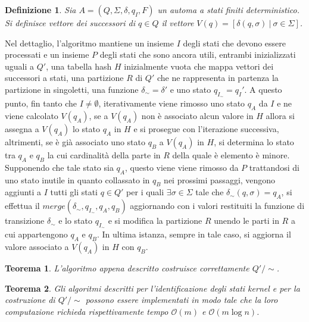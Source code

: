 \documentclass[a4paper,12pt,twoside,openright]{report}
\newcommand{\partitioned}[2]{#1\slash\!\!#2}  %
\newcommand{\bigo}[0]{\mathcal{O}}            %
\newtheorem{theorem}{Teorema}[chapter]        %
\newtheorem{definition}{Definizione}[chapter] %
\begin{document}
\begin{definition}
  Sia $A = (Q, \Sigma, \delta, q_I, F)$ un automa a stati finiti deterministico. Si definisce
  \emph{vettore dei successori} di $q \in Q$ il vettore $V(q) = [\delta(q, \sigma) \ | \ \sigma \in \Sigma]$.
\end{definition}

Nel dettaglio, l'algoritmo mantiene un insieme $I$ degli stati che devono essere processati e 
un insieme $P$ degli stati che sono ancora utili, entrambi inizializzati uguali a $Q'$,
una tabella hash $H$ inizialmente vuota che mappa vettori dei successori a stati,
una partizione $R$ di $Q'$ che ne rappresenta in partenza la partizione in singoletti, 
una funzione $\delta_\sim = \delta'$ e uno stato $q_{I_\sim} = q_I'$. 
A questo punto, fin tanto che $I \neq \emptyset$, iterativamente viene rimosso uno stato $q_A$ da $I$ e ne viene
calcolato $V(q_A)$, se a $V(q_A)$ non è associato alcun valore in $H$ allora si assegna a $V(q_A)$ lo stato $q_A$ in
$H$ e si prosegue con l'iterazione successiva, altrimenti, se è già associato uno stato $q_B$ a $V(q_A)$ in $H$, 
si determina lo stato tra $q_A$ e $q_B$ la cui cardinalità della parte in $R$ della quale è elemento è minore.
Supponendo che tale stato sia $q_A$, questo viene viene rimosso da $P$ trattandosi di uno stato inutile
in quanto collassato in $q_B$ nei prossimi passaggi, 
vengono aggiunti a $I$ tutti gli stati $q \in Q'$ per i quali $\exists \sigma \in \Sigma$ tale che
$\delta_\sim(q, \sigma) = q_A$, si effettua il $merge(\delta_\sim, q_{I_\sim}, q_A, q_B)$ aggiornando
con i valori restituiti la funzione di transizione $\delta_\sim$ e lo stato $q_{I_\sim}$ e 
si modifica la partizione $R$ unendo le parti in $R$ a cui appartengono $q_A$ e $q_B$. In ultima istanza, 
sempre in tale caso, si aggiorna il valore associato a $V(q_A)$ in $H$ con $q_B$.

\begin{theorem}\label{th:aeq-correctness}
  L'algoritmo appena descritto costruisce correttamente $\partitioned{Q'}{\sim}$.
\end{theorem}

\begin{theorem}
  \label{th:hm-complexity}
  Gli algoritmi descritti per l'identificazione degli stati kernel e per la costruzione di
  $\partitioned{Q'}{\sim}$ possono essere implementati in modo tale che la loro computazione richieda rispettivamente
  tempo $\bigo(m)$ e $\bigo(m \log n)$.
\end{theorem}
\end{document}
